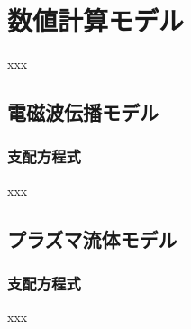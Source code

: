\documentclass[12pt,openany]{jsbook}        %
\begin{document}
%
%
%
\chapter{数値計算モデル}
xxx
%
%
%
\section{電磁波伝播モデル}
%
%
%
\subsection{支配方程式}
xxx
%
%
%
\section{プラズマ流体モデル}
%
%
%
\subsection{支配方程式}
xxx
%
%
%
\end{document}

